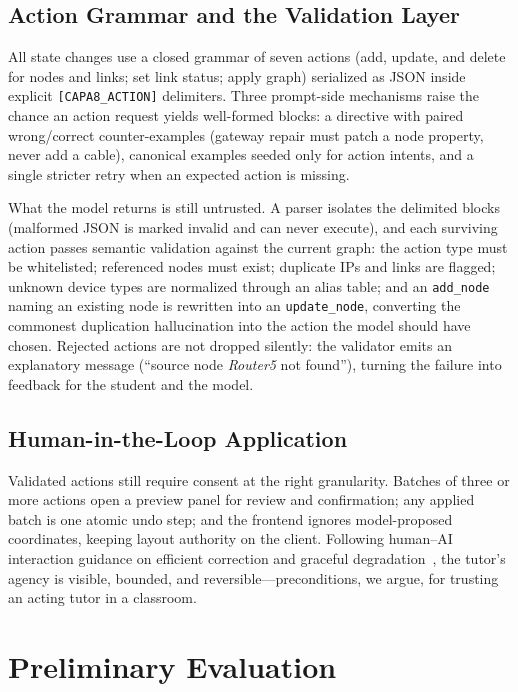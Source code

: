 \documentclass[conference,a4paper]{IEEEtran}
\begin{document}
\subsection{Action Grammar and the Validation Layer}
All state changes use a closed grammar of seven actions (add, update, and delete for nodes and links; set link status; apply graph) serialized as JSON inside explicit \texttt{[CAPA8\_ACTION]} delimiters. Three prompt-side mechanisms raise the chance an action request yields well-formed blocks: a directive with paired wrong/correct counter-examples (gateway repair must patch a node property, never add a cable), canonical examples seeded only for action intents, and a single stricter retry when an expected action is missing.

What the model returns is still untrusted. A parser isolates the delimited blocks (malformed JSON is marked invalid and can never execute), and each surviving action passes semantic validation against the current graph: the action type must be whitelisted; referenced nodes must exist; duplicate IPs and links are flagged; unknown device types are normalized through an alias table; and an \texttt{add\_node} naming an existing node is rewritten into an \texttt{update\_node}, converting the commonest duplication hallucination into the action the model should have chosen. Rejected actions are not dropped silently: the validator emits an explanatory message (``source node \emph{Router5} not found''), turning the failure into feedback for the student and the model.

\subsection{Human-in-the-Loop Application}
\label{sec:hitl}
Validated actions still require consent at the right granularity. Batches of three or more actions open a preview panel for review and confirmation; any applied batch is one atomic undo step; and the frontend ignores model-proposed coordinates, keeping layout authority on the client. Following human--AI interaction guidance on efficient correction and graceful degradation~\cite{amershi2019guidelines}, the tutor's agency is visible, bounded, and reversible---preconditions, we argue, for trusting an acting tutor in a classroom.

\section{Preliminary Evaluation}
\end{document}
